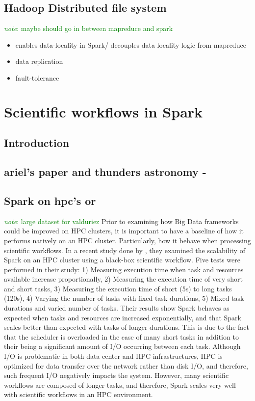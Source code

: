 \documentclass{report}
\newcommand{\note}[1]{\textcolor{green}{\textit{note}: #1}}
\begin{document}
	\section{Hadoop Distributed file system}
		\note{maybe should go in between mapreduce and spark}
		\begin{itemize}
			\item enables data-locality in Spark/ decouples data locality logic from mapreduce\
			\item data replication
			\item fault-tolerance
		\end{itemize}
\chapter{Scientific workflows in Spark}
	\section{Introduction}
	\section{ariel's paper and thunders astronomy - }
	\section{Spark on hpc's or }
	\note{large dataset for valduriez}
	Prior to examining how Big Data frameworks could be improved on HPC clusters, it is important to have a baseline of how it performs natively on an HPC cluster. Particularly, how it behave when processing scientific workflows. In a recent study done by \cite{valduriez}, they examined the scalability of Spark on an HPC cluster using a black-box scientific workflow. Five tests were performed in their study: 1) Measuring execution time when task and resources available increase proportionally, 2) Measuring the execution time of very short and short tasks, 3) Measuring the execution time of short (5s) to long tasks (120s), 4) Varying the number of tasks with fixed task durations, 5) Mixed task durations and varied number of tasks. Their results show Spark behaves as expected when tasks and resources are increased exponentially, and that Spark scales better than expected with tasks of longer durations. This is due to the fact that the scheduler is overloaded in the case of many short tasks in addition to their being a significant amount of I/O occurring between each task. Although I/O is problematic in both data center and HPC infrastructures, HPC is optimized for data transfer over the network rather than disk I/O, and therefore, such frequent I/O negatively impacts the system. However, many scientific workflows are composed of longer tasks, and therefore, Spark scales very well with scientific workflows in an HPC environment.
\end{document}
